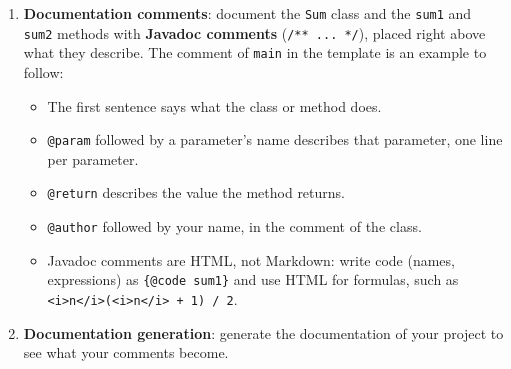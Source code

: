 \begin{enumerate}
\begin{enumerate}
            \item \textbf{Individual test}: print the results of \texttt{sum1} and \texttt{sum2} for \(n = 11\). Both must be \(66\).

            \item \textbf{Batch test}: use a loop to go through the following array of values: \texttt{\{3, 4, 13, 21, 67, 102, 155, 365, 1007\}}. For each value, print \(n\), the results of both methods and whether they are equal.

            \item \textbf{Automatic comparison}: instead of checking the numbers yourself, let the program tell you. Compare the results of \texttt{sum1} and \texttt{sum2} with \texttt{==}, which gives a \texttt{boolean}, and print it with \texttt{\%b}, which prints \texttt{true} or \texttt{false}. Every value in the array must print \texttt{true}.

        \end{enumerate}

    \item \textbf{Documentation comments}: document the \texttt{Sum} class and the \texttt{sum1} and \texttt{sum2} methods with \textbf{Javadoc comments} (\texttt{/** ... */}), placed right above what they describe. The comment of \texttt{main} in the template is an example to follow:

        \begin{itemize}

            \item The first sentence says what the class or method does.

            \item \texttt{@param} followed by a parameter's name describes that parameter, one line per parameter.

            \item \texttt{@return} describes the value the method returns.

            \item \texttt{@author} followed by your name, in the comment of the class.

            \item Javadoc comments are HTML, not Markdown: write code (names, expressions) as \texttt{\{@code sum1\}} and use HTML for formulas, such as \texttt{<i>n</i>(<i>n</i> + 1) / 2}.

        \end{itemize}

    \item \textbf{Documentation generation}: generate the documentation of your project to see what your comments become.


\end{enumerate}
